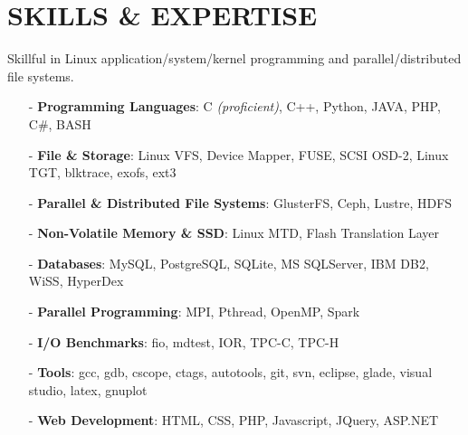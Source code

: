 \section{SKILLS \& EXPERTISE}
Skillful in Linux application/system/kernel programming and parallel/distributed file systems.
\begin{itemize}[leftmargin=*]
\setlength\itemsep{-0.02in}
\item[-] {\bf Programming Languages}: C {\footnotesize \it (proficient)}, C++,
         Python, JAVA, PHP, C\#, BASH
\item[-] {\bf File \& Storage}: Linux VFS, Device Mapper, FUSE, SCSI OSD-2, Linux TGT, blktrace, exofs, ext3
\item[-] {\bf Parallel \& Distributed File Systems}: GlusterFS, Ceph, Lustre, HDFS
\item[-] {\bf Non-Volatile Memory \& SSD}: Linux MTD, Flash Translation Layer
\item[-] {\bf Databases}: MySQL, PostgreSQL, SQLite, MS SQLServer, IBM DB2, WiSS, HyperDex
\item[-] {\bf Parallel Programming}: MPI, Pthread, OpenMP, Spark
\item[-] {\bf I/O Benchmarks}: fio, mdtest, IOR, TPC-C, TPC-H
\item[-] {\bf Tools}: gcc, gdb, cscope, ctags, autotools, git, svn, eclipse, glade, visual studio, latex, gnuplot
\item[-] {\bf Web Development}: HTML, CSS, PHP, Javascript, JQuery, ASP.NET
\end{itemize}

